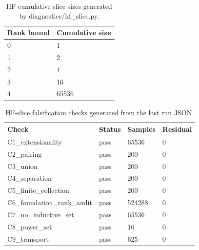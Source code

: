\begin{table}[t]
\centering
\small
\caption{HF cumulative slice sizes generated by diagnostics/hf\_slice.py.}
\label{tab:hf-slice-sizes}
\begin{tabular}{@{}ll@{}}
\toprule
Rank bound & Cumulative size \\
\midrule
0 & 1 \\
1 & 2 \\
2 & 4 \\
3 & 16 \\
4 & 65536 \\
\bottomrule
\end{tabular}
\end{table}
\begin{table}[t]
\centering
\small
\caption{HF-slice falsification checks generated from the last run JSON.}
\label{tab:hf-slice-checks}
\begin{tabular}{@{}llll@{}}
\toprule
Check & Status & Samples & Residual \\
\midrule
C1\_extensionality & pass & 65536 & 0 \\
C2\_pairing & pass & 200 & 0 \\
C3\_union & pass & 200 & 0 \\
C4\_separation & pass & 200 & 0 \\
C5\_finite\_collection & pass & 200 & 0 \\
C6\_foundation\_rank\_audit & pass & 524288 & 0 \\
C7\_no\_inductive\_set & pass & 65536 & 0 \\
C8\_power\_set & pass & 16 & 0 \\
C9\_transport & pass & 625 & 0 \\
\bottomrule
\end{tabular}
\end{table}
